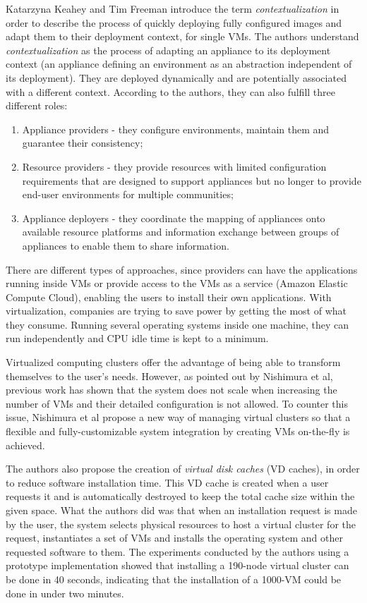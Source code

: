 Katarzyna Keahey and Tim Freeman introduce the term \textit{contextualization} in order to describe the process of quickly deploying fully configured images and adapt them to their deployment context, for single VMs. The authors understand \textit{contextualization} as the process of adapting an appliance to its deployment context (an appliance defining an environment as an abstraction independent of its deployment). They are deployed dynamically and are potentially associated with a different context. According to the authors, they can also fulfill three different roles:
\begin{enumerate}
\item Appliance providers - they configure environments, maintain them and guarantee their consistency;
\item Resource providers - they provide resources with limited configuration requirements that are designed to support appliances but no longer to provide end-user environments for multiple communities;
\item Appliance deployers - they coordinate the mapping of appliances  onto available resource platforms and information exchange between groups of appliances to enable them to share information.\cite{contextualization}
\end{enumerate}

There are different types of approaches, since providers can have the applications running inside VMs or provide access to the VMs as a service (Amazon Elastic Compute Cloud), enabling the users to install their own applications. With virtualization, companies are trying to save power by getting the most of what they consume. Running several operating systems inside one machine, they can run independently and CPU idle time is kept to a minimum.\cite{aaron-clouds}

Virtualized computing clusters offer the advantage of being able to transform themselves to the user's needs. However, as pointed out by Nishimura et al, previous work has shown that the system does not scale when increasing the number of VMs and their detailed configuration is not allowed. To counter this issue, Nishimura et al propose a new way of managing virtual clusters so that a flexible and fully-customizable system integration by creating VMs on-the-fly is achieved. 

The authors also propose the creation of \textit{virtual disk caches} (VD caches), in order to reduce software installation time. This VD cache is created when a user requests it and is automatically destroyed to keep the total cache size within the given space. What the authors did was that when an installation request is made by the user, the system selects physical resources to host a virtual cluster for the request, instantiates a set of VMs and installs the operating system and other requested software to them. The experiments conducted by the authors using a prototype implementation showed that installing a 190-node virtual cluster can be done in 40 seconds, indicating that the installation of a 1000-VM could be done in under two minutes.\cite{nishimura}

